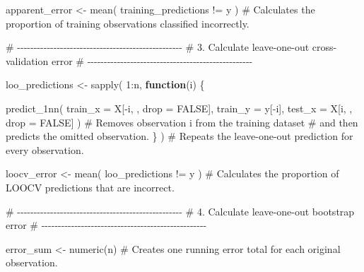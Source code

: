 \documentclass[
  letterpaper,
  DIV=11,
  numbers=noendperiod]{scrreprt}
\newenvironment{Shaded}{\begin{snugshade}}{\end{snugshade}}
\newcommand{\AttributeTok}[1]{\textcolor[rgb]{0.40,0.45,0.13}{#1}}
\newcommand{\CommentTok}[1]{\textcolor[rgb]{0.37,0.37,0.37}{#1}}
\newcommand{\ConstantTok}[1]{\textcolor[rgb]{0.56,0.35,0.01}{#1}}
\newcommand{\ControlFlowTok}[1]{\textcolor[rgb]{0.00,0.23,0.31}{\textbf{#1}}}
\newcommand{\DecValTok}[1]{\textcolor[rgb]{0.68,0.00,0.00}{#1}}
\newcommand{\FunctionTok}[1]{\textcolor[rgb]{0.28,0.35,0.67}{#1}}
\newcommand{\NormalTok}[1]{\textcolor[rgb]{0.00,0.23,0.31}{#1}}
\newcommand{\OtherTok}[1]{\textcolor[rgb]{0.00,0.23,0.31}{#1}}
\newcommand{\SpecialCharTok}[1]{\textcolor[rgb]{0.37,0.37,0.37}{#1}}
\begin{document}
\begin{Shaded}
\begin{Highlighting}[]
\NormalTok{  apparent\_error }\OtherTok{\textless{}{-}} \FunctionTok{mean}\NormalTok{(}
\NormalTok{    training\_predictions }\SpecialCharTok{!=}\NormalTok{ y}
\NormalTok{  )}
  \CommentTok{\# Calculates the proportion of training observations classified incorrectly.}


  \CommentTok{\# {-}{-}{-}{-}{-}{-}{-}{-}{-}{-}{-}{-}{-}{-}{-}{-}{-}{-}{-}{-}{-}{-}{-}{-}{-}{-}{-}{-}{-}{-}{-}{-}{-}{-}{-}{-}{-}{-}{-}{-}{-}{-}{-}{-}{-}{-}{-}{-}{-}{-}}
  \CommentTok{\# 3. Calculate leave{-}one{-}out cross{-}validation error}
  \CommentTok{\# {-}{-}{-}{-}{-}{-}{-}{-}{-}{-}{-}{-}{-}{-}{-}{-}{-}{-}{-}{-}{-}{-}{-}{-}{-}{-}{-}{-}{-}{-}{-}{-}{-}{-}{-}{-}{-}{-}{-}{-}{-}{-}{-}{-}{-}{-}{-}{-}{-}{-}}

\NormalTok{  loo\_predictions }\OtherTok{\textless{}{-}} \FunctionTok{sapply}\NormalTok{(}
    \DecValTok{1}\SpecialCharTok{:}\NormalTok{n,}
    \ControlFlowTok{function}\NormalTok{(i) \{}

      \FunctionTok{predict\_1nn}\NormalTok{(}
        \AttributeTok{train\_x =}\NormalTok{ X[}\SpecialCharTok{{-}}\NormalTok{i, , }\AttributeTok{drop =} \ConstantTok{FALSE}\NormalTok{],}
        \AttributeTok{train\_y =}\NormalTok{ y[}\SpecialCharTok{{-}}\NormalTok{i],}
        \AttributeTok{test\_x =}\NormalTok{ X[i, , }\AttributeTok{drop =} \ConstantTok{FALSE}\NormalTok{]}
\NormalTok{      )}
      \CommentTok{\# Removes observation i from the training dataset}
      \CommentTok{\# and then predicts the omitted observation.}
\NormalTok{    \}}
\NormalTok{  )}
  \CommentTok{\# Repeats the leave{-}one{-}out prediction for every observation.}

\NormalTok{  loocv\_error }\OtherTok{\textless{}{-}} \FunctionTok{mean}\NormalTok{(}
\NormalTok{    loo\_predictions }\SpecialCharTok{!=}\NormalTok{ y}
\NormalTok{  )}
  \CommentTok{\# Calculates the proportion of LOOCV predictions that are incorrect.}


  \CommentTok{\# {-}{-}{-}{-}{-}{-}{-}{-}{-}{-}{-}{-}{-}{-}{-}{-}{-}{-}{-}{-}{-}{-}{-}{-}{-}{-}{-}{-}{-}{-}{-}{-}{-}{-}{-}{-}{-}{-}{-}{-}{-}{-}{-}{-}{-}{-}{-}{-}{-}{-}}
  \CommentTok{\# 4. Calculate leave{-}one{-}out bootstrap error}
  \CommentTok{\# {-}{-}{-}{-}{-}{-}{-}{-}{-}{-}{-}{-}{-}{-}{-}{-}{-}{-}{-}{-}{-}{-}{-}{-}{-}{-}{-}{-}{-}{-}{-}{-}{-}{-}{-}{-}{-}{-}{-}{-}{-}{-}{-}{-}{-}{-}{-}{-}{-}{-}}

\NormalTok{  error\_sum }\OtherTok{\textless{}{-}} \FunctionTok{numeric}\NormalTok{(n)}
  \CommentTok{\# Creates one running error total for each original observation.}


\end{Highlighting}
\end{Shaded}
\end{document}

